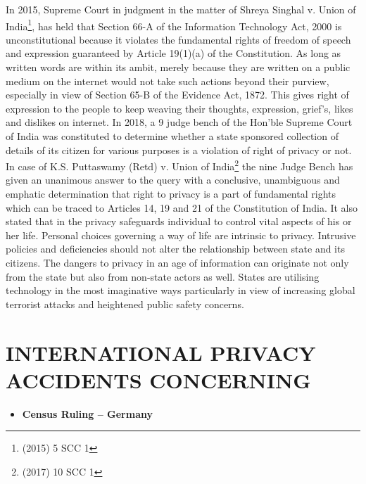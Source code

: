 \begin{multicols}{2}
\begin{itemize}
In 2015, Supreme Court in judgment in the matter of Shreya Singhal v. Union of India\footnote{ (2015) 5 SCC 1}, has held that Section 66-A of the Information Technology Act, 2000 is unconstitutional because it violates the fundamental rights of freedom of speech and expression guaranteed by Article 19(1)(a) of the Constitution. As long as written words are within its ambit, merely because they are written on a public medium on the internet would not take such actions beyond their purview, especially in view of Section 65-B of the Evidence Act, 1872. This gives right of expression to the people to keep weaving their thoughts, expression, grief’s, likes and dislikes on internet. In 2018, a 9 judge bench of the Hon’ble Supreme Court of India was constituted to determine whether a state sponsored collection of details of its citizen for various purposes is a violation of right of privacy or not. In case of K.S. Puttaswamy (Retd) v. Union of India\footnote{(2017) 10 SCC 1} the nine Judge Bench has given an unanimous answer to the query with a conclusive, unambiguous and emphatic determination that right to privacy is a part of fundamental rights which can be traced to Articles 14, 19 and 21 of the Constitution of India. It also stated that in the privacy safeguards individual to control vital aspects of his or her life. Personal choices governing a way of life are intrinsic to privacy. Intrusive policies and deficiencies should not alter the relationship between state and its citizens. The dangers to privacy in an age of information can originate not only from the state but also from non-state actors as well. States are utilising technology in the most imaginative ways particularly in view of increasing global terrorist attacks and heightened public safety concerns. 
\end{itemize}

\section{INTERNATIONAL PRIVACY\\ ACCIDENTS CONCERNING}

\begin{itemize}

\item[{\bf 1)}] \textbf{Census Ruling – Germany}


\end{itemize}
\end{multicols}
